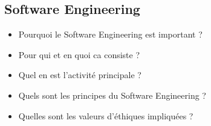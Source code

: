 \subsection{Software Engineering}


\begin{itemize}
	\item Pourquoi le Software Engineering est important ?
	\item Pour qui et en quoi ca consiste ?
	\item Quel en est l'activité principale ?
	\item Quels sont les principes du Software Engineering ?
	\item Quelles sont les valeurs d'éthiques impliquées ?
\end{itemize}